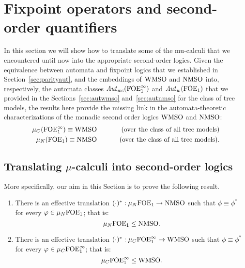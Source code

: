 \section{Fixpoint operators and second-order quantifiers}
\label{sec:fixpointToSO}

In this section we will show how to translate some of the mu-calculi that we
encountered until now into the appropriate second-order logics.
Given the equivalence between automata and fixpoint logics that we established 
in Section~\ref{sec:parityaut}, and the embeddings of $\mathrm{WMSO}$ and $\mathrm{NMSO}$ into,
respectively, the automata classes $\mathit{Aut}_{wc}(\mathrm{FOE}^{\infty}_1)$ and $\mathit{Aut}_{w}(\mathrm{FOE}_1)$ that
we provided in the Sections~\ref{sec:autwmso} and~\ref{sec:autnmso} for the 
class of tree models, the results here provide the missing link in the 
automata-theoretic characterizations of the monadic second order logics
$\mathrm{WMSO}$ and $\mathrm{NMSO}$:
\begin{eqnarray*}
   \mu_{C}(\mathrm{FOE}^{\infty}_1) \equiv \mathrm{WMSO} 
   && \qquad  \text{ (over the class of all tree models)} 
\\ \mu_{N}(\mathrm{FOE}_1)  \equiv \mathrm{NMSO} 
   && \qquad  \text{ (over the class of all tree models)}. 
\end{eqnarray*}

\subsection{Translating $\mu$-calculi into second-order logics}

More specifically, our aim in this Section is to prove the following result.

\begin{theorem}
\label{t:mfl2mso}
\begin{enumerate}[(1)]
\item
There is an effective translation $(\cdot)^{*}: \mu_{N}\mathrm{FOE}_1 \to \mathrm{NMSO}$
such that $\phi \equiv \phi^{*}$ for every $\varphi \in \mu_{N}\mathrm{FOE}_1$; that is:
\[
\mu_{N}\mathrm{FOE}_1 \leq \mathrm{NMSO}.
\]

\item
There is an effective translation $(\cdot)^{*}: \mu_{C}\mathrm{FOE}^{\infty}_1 \to \mathrm{WMSO}$
such that $\phi \equiv \phi^{*}$ for every $\varphi \in \mu_{C}\mathrm{FOE}^{\infty}_1$; that is:
\[
\mu_{C}\mathrm{FOE}^{\infty}_1 \leq \mathrm{WMSO}.
\]
\end{enumerate}
\end{theorem}

